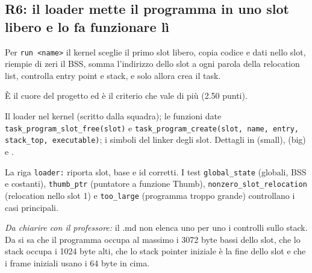 \subsection{R6: il loader mette il programma in uno slot libero e lo fa funzionare lì}
\begin{description}\sloppy
    \item[Che cosa chiede] Per \texttt{run <name>} il kernel sceglie il primo slot libero, copia codice e dati nello slot, riempie di zeri il BSS, somma l'indirizzo dello slot a ogni parola della relocation list, controlla entry point e stack, e solo allora crea il task.
    \item[Perché serve] È il cuore del progetto ed è il criterio che vale di più (2.50 punti).
    \item[Dove si interviene] Il loader nel kernel (scritto dalla squadra); le funzioni date \texttt{task\_program\_slot\_free(slot)} e \texttt{task\_program\_create(slot, name, entry, stack\_top, executable)}; i simboli del linker degli slot. Dettagli in  (small),  (big) e .
    \item[Come si verifica] La riga \texttt{loader:} riporta slot, base e id corretti. I test \texttt{global\_state} (globali, BSS e costanti), \texttt{thumb\_ptr} (puntatore a funzione Thumb), \texttt{nonzero\_slot\_relocation} (relocation nello slot 1) e \texttt{too\_large} (programma troppo grande) controllano i casi principali.
\end{description}
\emph{Da chiarire con il professore:} il .md non elenca uno per uno i controlli sullo stack. Da  si sa che il programma occupa al massimo i 3072 byte bassi dello slot, che lo stack occupa i 1024 byte alti, che lo stack pointer iniziale è la fine dello slot e che i frame iniziali usano i 64 byte in cima.

